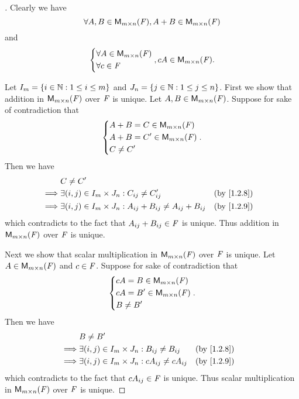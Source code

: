 \begin{proof}[]
  Clearly we have
  \[
    \forall A, B \in \ms, A + B \in \ms
  \]
  and
  \[
    \begin{dcases}
      \forall A \in \ms \\
      \forall c \in \F
    \end{dcases}, cA \in \ms.
  \]

  Let \(I_m = \left\lbrace i \in \mathbb{N} : 1 \leq i \leq m\right\rbrace\) and \(J_n = \left\lbrace j \in \mathbb{N} : 1 \leq j \leq n\right\rbrace\).
  First we show that addition in \(\ms\) over \(\mathit{F}\) is unique.
  Let \(A, B \in \ms\).
  Suppose for sake of contradiction that
  \[
    \begin{dcases}
      A + B = C \in \ms  \\
      A + B = C' \in \ms \\
      C \neq C'
    \end{dcases}.
  \]
  Then we have
  \begin{align*}
             & C \neq C'                                                                                     \\
    \implies & \exists (i, j) \in I_m \times J_n :  C_{i j} \neq C_{i j}'                    &  & \by{1.2.8} \\
    \implies & \exists (i, j) \in I_m \times J_n :  A_{i j} + B_{i j} \neq A_{i j} + B_{i j} &  & \by{1.2.9}
  \end{align*}
  which contradicts to the fact that \(A_{i j} + B_{i j} \in \mathit{F}\) is unique.
  Thus addition in \(\ms\) over \(\mathit{F}\) is unique.

  Next we show that scalar multiplication in \(\ms\) over \(\mathit{F}\) is unique.
  Let \(A \in \ms\) and \(c \in \mathit{F}\).
  Suppose for sake of contradiction that
  \[
    \begin{dcases}
      cA = B \in \ms  \\
      cA = B' \in \ms \\
      B \neq B'
    \end{dcases}.
  \]
  Then we have
  \begin{align*}
             & B \neq B'                                                                    \\
    \implies & \exists (i, j) \in I_m \times J_n : B_{i j} \neq B_{i j}     &  & \by{1.2.8} \\
    \implies & \exists (i, j) \in I_m \times J_n : c A_{i j} \neq c A_{i j} &  & \by{1.2.9}
  \end{align*}
  which contradicts to the fact that \(c A_{i j} \in \mathit{F}\) is unique.
  Thus scalar multiplication in \(\ms\) over \(\mathit{F}\) is unique.


\end{proof}
